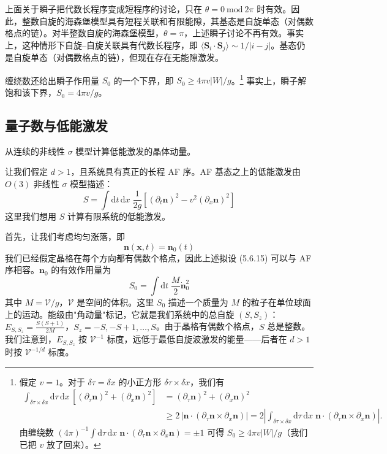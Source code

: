 上面关于瞬子把代数长程序变成短程序的讨论，只在 $\theta=0\ \mathrm{mod}\ 2\pi$ 时有效。因此，整数自旋的海森堡模型具有短程关联和有限能隙，其基态是自旋单态（对偶数格点的链）。对半整数自旋的海森堡模型，$\theta=\pi$，上述瞬子讨论不再有效。事实上，这种情形下自旋--自旋关联具有代数长程序，即 $\langle\pmb{S}_{i}\cdot\pmb{S}_{j}\rangle\sim 1/|i-j|$。基态仍是自旋单态（对偶数格点的链），但现在存在无能隙激发。

缠绕数还给出瞬子作用量 $S_{0}$ 的一个下界，即 $S_{0}\geqslant 4\pi v|W|/g$。\footnote{假定 $v=1$。对于 $\delta\tau=\delta x$ 的小正方形 $\delta\tau\times\delta x$，我们有
\begin{align*}
\int_{\delta\tau\times\delta x}\mathrm{d}\tau\,\mathrm{d}x\,\left[(\partial_{\tau}\pmb{n})^{2}+(\partial_{x}\pmb{n})^{2}\right]&=(\partial_{\tau}\pmb{n})^{2}+(\partial_{x}\pmb{n})^{2}\\
&\geqslant 2\,|\pmb{n}\cdot(\partial_{\tau}\pmb{n}\times\partial_{x}\pmb{n})|=2\left|\int_{\delta\tau\times\delta x}\mathrm{d}\tau\,\mathrm{d}x\;\pmb{n}\cdot(\partial_{\tau}\pmb{n}\times\partial_{x}\pmb{n})\right|.
\end{align*}
由缠绕数 $(4\pi)^{-1}\int \mathrm{d}\tau\,\mathrm{d}x\;\pmb{n}\cdot(\partial_{\tau}\pmb{n}\times\partial_{x}\pmb{n})=\pm 1$ 可得 $S_{0}\geqslant 4\pi v|W|/g$（我们已把 $v$ 放了回来）。} 事实上，瞬子解饱和该下界，$S_{0}=4\pi v/g$。

\subsection{量子数与低能激发}

\begin{keypoints}
\item 从连续的非线性 $\sigma$ 模型计算低能激发的晶体动量。
\end{keypoints}

让我们假定 $d>1$，且系统具有真正的长程 AF 序。AF 基态之上的低能激发由 $O(3)$ 非线性 $\sigma$ 模型描述：
\begin{equation*}
S=\int \mathrm{d}t\,\mathrm{d}x\;\frac{1}{2g}\left[(\partial_{t}\pmb{n})^{2}-v^{2}(\partial_{x}\pmb{n})^{2}\right] \tag{5.6.14}
\end{equation*}
这里我们想用 $S$ 计算有限系统的低能激发。

首先，让我们考虑均匀涨落，即
\begin{equation*}
\pmb{n}(\pmb{x},t)=\pmb{n}_{0}(t) \tag{5.6.15}
\end{equation*}
我们已经假定晶格在每个方向都有偶数个格点，因此上述拟设 (5.6.15) 可以与 AF 序相容。$\pmb{n}_{0}$ 的有效作用量为
\begin{equation*}
S_{0}=\int \mathrm{d}t\;\frac{M}{2}\dot{\pmb{n}}^{2}_{0}
\end{equation*}
其中 $M=\mathcal{V}/g$，$\mathcal{V}$ 是空间的体积。这里 $S_{0}$ 描述一个质量为 $M$ 的粒子在单位球面上的运动。能级由"角动量"标记，它就是我们系统中的总自旋 $(S,S_{z})$：$E_{S,S_{z}}=\frac{S(S+1)}{2M}$，$S_{z}=-S,-S+1,\ldots,S$。由于晶格有偶数个格点，$S$ 总是整数。我们注意到，$E_{S,S_{z}}$ 按 $\mathcal{V}^{-1}$ 标度，远低于最低自旋波激发的能量——后者在 $d>1$ 时按 $\mathcal{V}^{-1/d}$ 标度。

